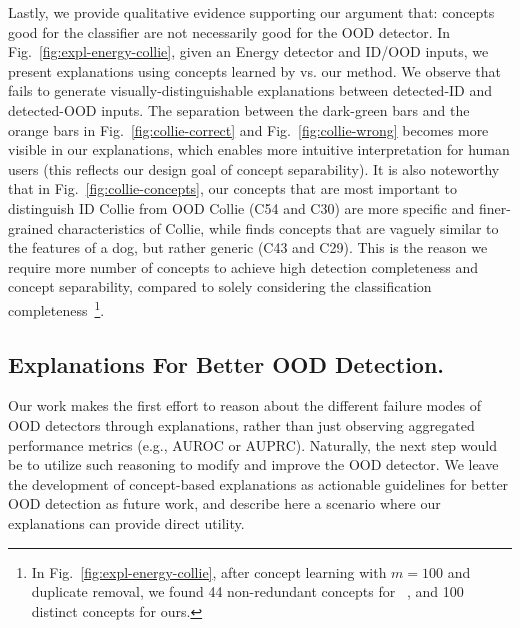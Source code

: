 Lastly, we provide qualitative evidence supporting our argument that: concepts good for the classifier are not necessarily good for the OOD detector.
In Fig.~\ref{fig:expl-energy-collie}, given an Energy detector and ID/OOD inputs, we present explanations using  concepts learned by \citet{yeh2020completeness} vs. our method.
We observe that~\citet{yeh2020completeness} fails to generate visually-distinguishable explanations between detected-ID and detected-OOD inputs.
The separation between the dark-green bars and the orange bars in Fig.~\ref{fig:collie-correct} and Fig.~\ref{fig:collie-wrong} becomes more visible in our explanations, which enables more intuitive interpretation for human users (this reflects our design goal of concept separability).
It is also noteworthy that in Fig.~\ref{fig:collie-concepts}, our concepts that are most important to distinguish ID Collie from OOD Collie (\ie C54 and C30) are more specific and finer-grained characteristics of Collie, while \citet{yeh2020completeness} finds concepts that are vaguely similar to the features of a dog, but rather generic (\ie C43 and C29).
This is the reason we require more number of concepts to achieve high detection completeness and concept separability, compared to solely considering the classification completeness~\footnote{In Fig.~\ref{fig:expl-energy-collie}, after concept learning with $m = 100$ and duplicate removal, we found 44 non-redundant concepts for ~\citet{yeh2020completeness}, and 100 distinct concepts for ours.}.


\subsection{Explanations For Better OOD Detection.}
Our work makes the first effort to reason about the different failure modes of OOD detectors through explanations, rather than just observing aggregated performance metrics (e.g., AUROC or AUPRC).
Naturally, the next step would be to utilize such reasoning to modify and improve the OOD detector. 
We leave the development of concept-based explanations as actionable guidelines for better OOD detection as future work, and describe here a scenario where our explanations can provide direct utility.

